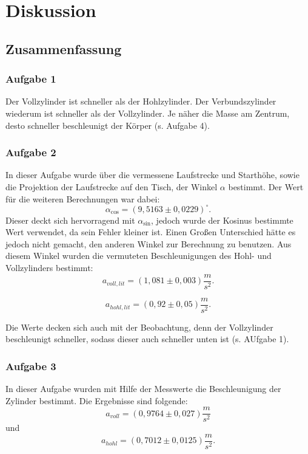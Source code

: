 \chapter{Diskussion}
\label{ch:diskussion}

\section{Zusammenfassung}
\subsection{Aufgabe 1}
Der Vollzylinder ist schneller als der Hohlzylinder. Der Verbundszylinder wiederum ist schneller als der Vollzylinder. Je näher die Masse am Zentrum, desto schneller beschleunigt der Körper (s. Aufgabe 4).

\subsection{Aufgabe 2}
In dieser Aufgabe wurde über die vermessene Laufstrecke und Starthöhe, sowie die Projektion der Laufstrecke auf den Tisch, der Winkel $\alpha$ bestimmt. Der Wert für die weiteren Berechnungen war dabei:
\begin{equation}
\boxed{
    \alpha_{\cos} = (9,5163 \pm 0,0229) ^\circ
}.
\end{equation}
Dieser deckt sich hervorragend mit $\alpha_{\sin}$, jedoch wurde der Kosinus bestimmte Wert verwendet, da sein Fehler kleiner ist. Einen Großen Unterschied hätte es jedoch nicht gemacht, den anderen Winkel zur Berechnung zu benutzen.
Aus diesem Winkel wurden die vermuteten Beschleunigungen des Hohl- und Vollzylinders bestimmt:
\begin{equation}
    \boxed{
        a_{voll,lit} = (1,081 \pm 0,003) \frac{m}{s^2}
    }.
\end{equation}

\begin{equation}
    \boxed{
        a_{hohl,lit} = (0,92 \pm 0,05) \frac{m}{s^2}
    }.
\end{equation}

Die Werte decken sich auch mit der Beobachtung, denn der Vollzylinder beschleunigt schneller, sodass dieser auch schneller unten ist (s. AUfgabe 1).

\subsection{Aufgabe 3}
In dieser Aufgabe wurden mit Hilfe der Messwerte die Beschleunigung der Zylinder bestimmt. Die Ergebnisse sind folgende:
\begin{equation}
    \boxed{
        a_{voll} = (0,9764 \pm 0,027) \frac{m}{s^2}
    }
\end{equation}
und
\begin{equation}
\boxed{
    a_{hohl} = (0,7012 \pm 0,0125) \frac{m}{s^2}
}.
\end{equation}

